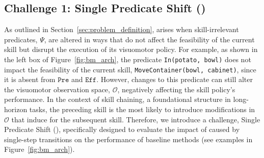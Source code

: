 





\subsection{Challenge 1: Single Predicate Shift (\bma)}
\label{subsec:bm_1}



As outlined in Section~\ref{sec:problem_definition}, \pb arises when skill-irrelevant predicates, $\Psi$, are altered in ways that do not affect the feasibility of the current skill but disrupt the execution of its visuomotor policy. For example, as shown in the left box of Figure~\ref{fig:bm_arch}, the predicate \texttt{In(potato, bowl)} does not impact the feasibility of the current skill, \texttt{MoveContainer(bowl, cabinet)}, since it is absent from $\texttt{Pre}$ and $\texttt{Eff}$. However, changes to this predicate can still alter the visuomotor observation space, $\mathcal{O}$, negatively affecting the skill policy's performance. In the context of skill chaining, a foundational structure in long-horizon tasks, the preceding skill is the most likely to introduce modifications in $\mathcal{O}$ that induce \pb for the subsequent skill. Therefore, we introduce a challenge, Single Predicate Shift (\bma), specifically designed to evaluate the impact of \pb caused by single-step transitions on the performance of baseline methods (see examples in Figure~\ref{fig:bm_arch}).

